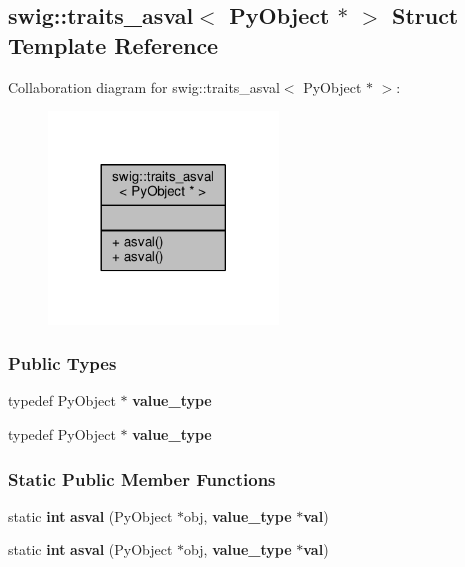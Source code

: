 \subsection{swig\+:\+:traits\+\_\+asval$<$ Py\+Object $\ast$ $>$ Struct Template Reference}
\label{structswig_1_1traits__asval_3_01PyObject_01_5_01_4}


Collaboration diagram for swig\+:\+:traits\+\_\+asval$<$ Py\+Object $\ast$ $>$\+:
\nopagebreak
\begin{figure}[H]
\begin{center}
\leavevmode
\includegraphics[width=173pt]{de/de8/structswig_1_1traits__asval_3_01PyObject_01_5_01_4__coll__graph}
\end{center}
\end{figure}
\subsubsection*{Public Types}
\begin{DoxyCompactItemize}
\item 
typedef Py\+Object $\ast$ {\bf value\+\_\+type}
\item 
typedef Py\+Object $\ast$ {\bf value\+\_\+type}
\end{DoxyCompactItemize}
\subsubsection*{Static Public Member Functions}
\begin{DoxyCompactItemize}
\item 
static {\bf int} {\bf asval} (Py\+Object $\ast$obj, {\bf value\+\_\+type} $\ast${\bf val})
\item 
static {\bf int} {\bf asval} (Py\+Object $\ast$obj, {\bf value\+\_\+type} $\ast${\bf val})
\end{DoxyCompactItemize}


